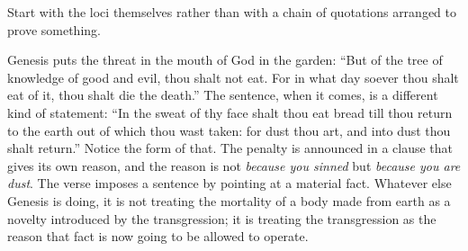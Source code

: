 Start with the loci themselves rather than with a chain of quotations arranged to prove something.

Genesis puts the threat in the mouth of God in the garden: ``But of the tree of knowledge of good and evil, thou shalt not eat. For in what day soever thou shalt eat of it, thou shalt die the death.'' The sentence, when it comes, is a different kind of statement: ``In the sweat of thy face shalt thou eat bread till thou return to the earth out of which thou wast taken: for dust thou art, and into dust thou shalt return.'' Notice the form of that. The penalty is announced in a clause that gives its own reason, and the reason is not \emph{because you sinned} but \emph{because you are dust}. The verse imposes a sentence by pointing at a material fact. Whatever else Genesis is doing, it is not treating the mortality of a body made from earth as a novelty introduced by the transgression; it is treating the transgression as the reason that fact is now going to be allowed to operate.

